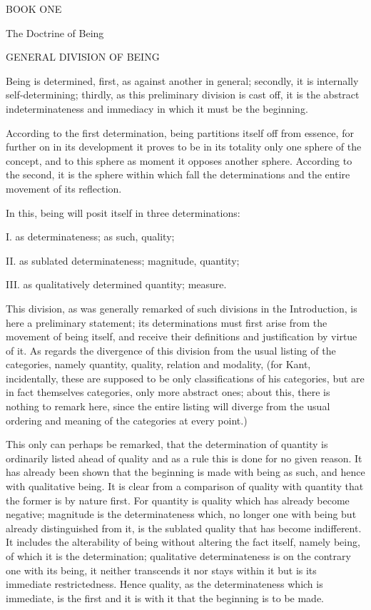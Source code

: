 
BOOK ONE

The Doctrine of Being

GENERAL DIVISION OF BEING

Being is determined, first, as against another in general;
secondly, it is internally self-determining;
thirdly, as this preliminary division is cast off,
it is the abstract indeterminateness and immediacy
in which it must be the beginning.

According to the first determination,
being partitions itself off from essence,
for further on in its development it proves to be
in its totality only one sphere of the concept,
and to this sphere as moment it opposes another sphere.
According to the second, it is the sphere
within which fall the determinations
and the entire movement of its reflection.

In this, being will posit itself in three determinations:

I. as determinateness; as such, quality;

II. as sublated determinateness; magnitude, quantity;

III. as qualitatively determined quantity; measure.

This division, as was generally remarked of
such divisions in the Introduction,
is here a preliminary statement;
its determinations must first arise
from the movement of being itself,
and receive their definitions and justification by virtue of it.
As regards the divergence of this division from
the usual listing of the categories,
namely quantity, quality, relation and modality,
(for Kant, incidentally, these are supposed to be
only classifications of his categories,
but are in fact themselves categories,
only more abstract ones;
about this, there is nothing to remark here,
since the entire listing will diverge from
the usual ordering and meaning of
the categories at every point.)

This only can perhaps be remarked,
that the determination of quantity
is ordinarily listed ahead of quality and as a rule
this is done for no given reason.
It has already been shown that
the beginning is made with being as such,
and hence with qualitative being.
It is clear from a comparison of quality with quantity
that the former is by nature first.
For quantity is quality which has already become negative;
magnitude is the determinateness which,
no longer one with being but already distinguished from it,
is the sublated quality that has become indifferent.
It includes the alterability of being
without altering the fact itself,
namely being, of which it is the determination;
qualitative determinateness is on the contrary one with its being,
it neither transcends it nor stays within it
but is its immediate restrictedness.
Hence quality, as the determinateness which is immediate,
is the first and it is with it that the beginning is to be made.

